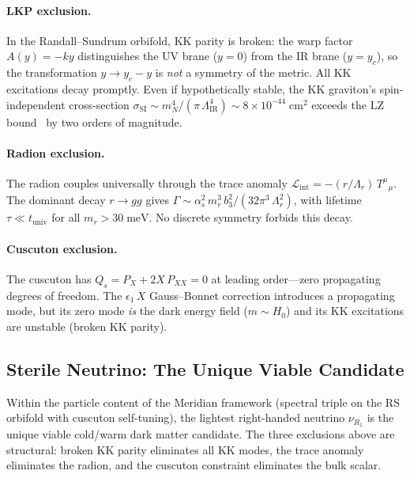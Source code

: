 \paragraph{LKP exclusion.} In the Randall--Sundrum orbifold, KK parity is broken: the warp factor $A(y) = -ky$ distinguishes the UV brane ($y = 0$) from the IR brane ($y = y_c$), so the transformation $y \to y_c - y$ is \emph{not} a symmetry of the metric. All KK excitations decay promptly. Even if hypothetically stable, the KK graviton's spin-independent cross-section $\sigma_{\mathrm{SI}} \sim m_N^4/(\pi\, \Lambda_{\mathrm{IR}}^4) \sim 8 \times 10^{-44}\;\mathrm{cm}^2$ exceeds the LZ bound~\cite{ch4:LZ2024} by two orders of magnitude.

\paragraph{Radion exclusion.} The radion couples universally through the trace anomaly $\mathcal{L}_{\mathrm{int}} = -(r/\Lambda_r)\, T^\mu{}_\mu$. The dominant decay $r \to gg$ gives $\Gamma \sim \alpha_s^2\, m_r^3\, b_3^2/(32\pi^3\, \Lambda_r^2)$, with lifetime $\tau \ll t_{\mathrm{univ}}$ for all $m_r > 30\;\mathrm{meV}$. No discrete symmetry forbids this decay.

\paragraph{Cuscuton exclusion.} The cuscuton has $Q_s = P_X + 2X\, P_{XX} = 0$ at leading order---zero propagating degrees of freedom. The $\epsilon_1\, X$ Gauss--Bonnet correction introduces a propagating mode, but its zero mode \emph{is} the dark energy field ($m \sim H_0$) and its KK excitations are unstable (broken KK parity).

\subsection{Sterile Neutrino: The Unique Viable Candidate}
\label{sec:4-dm-sterile}

\begin{theorem}\label{thm:4-dm}
Within the particle content of the Meridian framework (spectral triple on the RS orbifold with cuscuton self-tuning), the lightest right-handed neutrino $\nu_{R_1}$ is the unique viable cold/warm dark matter candidate. The three exclusions above are structural: broken KK parity eliminates all KK modes, the trace anomaly eliminates the radion, and the cuscuton constraint eliminates the bulk scalar.
\end{theorem}

